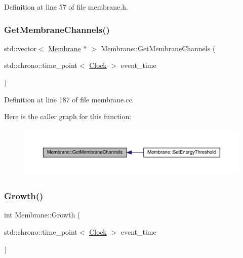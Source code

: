 Definition at line 57 of file membrane.\+h.

\mbox{\label{class_membrane_a7fac2929241b7ff9b8b7f1ec955b2cc5}} 
\subsubsection{\texorpdfstring{Get\+Membrane\+Channels()}{GetMembraneChannels()}}
{\footnotesize\ttfamily std\+::vector$<$ \hyperlink{class_membrane}{Membrane} $\ast$ $>$ Membrane\+::\+Get\+Membrane\+Channels (\begin{DoxyParamCaption}\item[{std\+::chrono\+::time\+\_\+point$<$ \hyperlink{universe_8h_a0ef8d951d1ca5ab3cfaf7ab4c7a6fd80}{Clock} $>$}]{event\+\_\+time }\end{DoxyParamCaption})}



Definition at line 187 of file membrane.\+cc.

Here is the caller graph for this function\+:
\nopagebreak
\begin{figure}[H]
\begin{center}
\leavevmode
\includegraphics[width=350pt]{class_membrane_a7fac2929241b7ff9b8b7f1ec955b2cc5_icgraph}
\end{center}
\end{figure}
\mbox{\label{class_membrane_a544742864485b9ac052f3b241ae5c6b4}} 
\subsubsection{\texorpdfstring{Growth()}{Growth()}}
{\footnotesize\ttfamily int Membrane\+::\+Growth (\begin{DoxyParamCaption}\item[{std\+::chrono\+::time\+\_\+point$<$ \hyperlink{universe_8h_a0ef8d951d1ca5ab3cfaf7ab4c7a6fd80}{Clock} $>$}]{event\+\_\+time }\end{DoxyParamCaption})}



